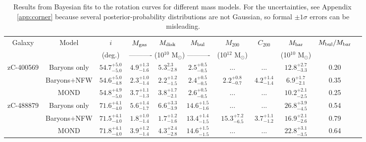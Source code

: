 \begin{table}
\caption[]{Results from Bayesian fits to the rotation curves for different mass models. For the uncertainties, see Appendix\,\ref{app:corner} because several posterior-probability distributions are not Gaussian, so formal $\pm1\sigma$ errors can be misleading.}
\centering
\footnotesize
\label{tab:mass}
\renewcommand{\arraystretch}{1.3}
\begin{tabular}{ccccccccccc}
\hline
\noalign{\smallskip}
Galaxy & Model & $i$ & $M_{\rm gas}$ & $M_{\rm disk}$ & $M_{\rm bul}$ & $M_{200}$ & $C_{200}$ & $M_{\rm bar}$ & $M_{\rm bul}/M_{\rm bar}$\\
&      & (deg.) & \multicolumn{3}{c}{---------- (10$^{10}$ M$_\odot$) ----------} & (10$^{12}$ M$_\odot$) & & (10$^{10}$ M$_\odot$) & \\
\hline
zC-400569 & Baryons only & $54.7_{-5.0}^{+5.0}$ & $4.9_{-1.6}^{+1.3}$ & $5.3_{-2.8}^{2.3}$ & $2.5_{-0.5}^{+0.5}$ & ... & ... & $12.8_{-3.3}^{+2.7}$ & 0.20\\
& Baryons$+$NFW & $54.6_{-4.8}^{+5.0}$ & $2.3_{-1.4}^{+1.0}$ & $2.2_{-1.5}^{+1.2}$ & $2.4_{-0.5}^{+0.5}$ & $2.2_{-0.7}^{+0.8}$ & $4.2_{-1.4}^{+1.4}$ &
$6.9_{-2.1}^{+1.7}$ & 0.35\\
& MOND & $54.8_{-5.0}^{+4.9}$ & $3.7_{-1.3}^{+1.1}$ & $3.8_{-2.1}^{+1.7}$ & $2.6_{-0.5}^{+0.5}$ & ... & ... & $10.2_{-2.5}^{+2.1}$& 0.25\\
zC-488879 & Baryons only & $71.6_{-4.0}^{+4.1}$ & $5.6_{-1.7}^{+1.4}$ & $6.6_{-3.9}^{+3.3}$ & $14.6_{-1.6}^{+1.5}$ & ... & ... & $26.8_{-4.5}^{+3.9}$ & 0.54\\
& Baryons$+$NFW & $71.5_{-4.0}^{+4.1}$ & $1.8_{-1.4}^{+1.0}$ & $1.7_{-1.6}^{+1.2}$ & $13.4_{-1.5}^{+1.4}$ & $15.3_{-6.5}^{+7.2}$ & $3.7_{-1.2}^{+1.1}$ & $16.9_{-2.6}^{+2.1}$ & 0.79\\
& MOND & $71.8_{-4.0}^{+4.1}$ & $3.9_{-1.4}^{+1.2}$ & $4.3_{-2.8}^{+2.4}$ & $14.6_{-1.5}^{+1.5}$ & ... & ... & $22.8_{-3.5}^{+3.1}$ & 0.64\\
\hline
\end{tabular}
\end{table}
